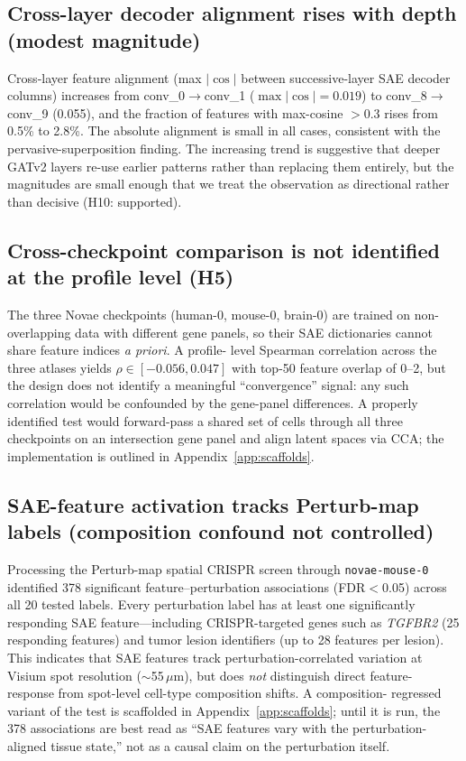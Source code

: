 \documentclass[11pt]{article}
\begin{document}
\subsection{Cross-layer decoder alignment rises with depth (modest magnitude)}
\label{sec:cross_layer}

Cross-layer feature alignment (max $|\cos|$ between successive-layer
SAE decoder columns) increases from conv\_0$\to$conv\_1
($\max |\cos| = 0.019$) to conv\_8$\to$conv\_9 (0.055), and the
fraction of features with max-cosine $> 0.3$ rises from 0.5\% to
2.8\%. The absolute alignment is small in all cases, consistent with
the pervasive-superposition finding. The increasing trend is
suggestive that deeper GATv2 layers re-use earlier patterns rather
than replacing them entirely, but the magnitudes are small enough
that we treat the observation as directional rather than decisive
(H10: supported).

\subsection{Cross-checkpoint comparison is not identified at the profile level (H5)}
\label{sec:h5}

The three Novae checkpoints (human-0, mouse-0, brain-0) are trained
on non-overlapping data with different gene panels, so their SAE
dictionaries cannot share feature indices \emph{a priori}. A profile-
level Spearman correlation across the three atlases yields
$\rho \in [-0.056, 0.047]$ with top-50 feature overlap of 0--2, but
the design does not identify a meaningful ``convergence'' signal:
any such correlation would be confounded by the gene-panel
differences. A properly identified test would forward-pass a shared
set of cells through all three checkpoints on an intersection gene
panel and align latent spaces via CCA; the implementation is
outlined in Appendix~\ref{app:scaffolds}.

\subsection{SAE-feature activation tracks Perturb-map labels (composition confound not controlled)}
\label{sec:perturbmap}

Processing the Perturb-map spatial CRISPR screen through
\texttt{novae-mouse-0} identified 378 significant
feature--perturbation associations (FDR$<$0.05) across all 20 tested
labels. Every perturbation label has at least one significantly
responding SAE feature---including CRISPR-targeted genes such as
\emph{TGFBR2} (25 responding features) and tumor lesion identifiers
(up to 28 features per lesion). This indicates that SAE features
track perturbation-correlated variation at Visium spot resolution
($\sim$55\,$\mu$m), but does \emph{not} distinguish direct feature-
response from spot-level cell-type composition shifts. A composition-
regressed variant of the test is scaffolded in
Appendix~\ref{app:scaffolds}; until it is run, the 378 associations
are best read as ``SAE features vary with the perturbation-aligned
tissue state,'' not as a causal claim on the perturbation itself.
\end{document}
